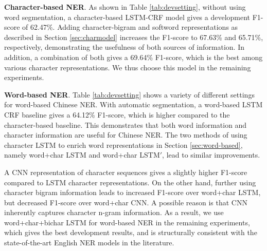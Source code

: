 \documentclass[11pt,a4paper]{article}
\begin{document}
\begin{CJK*}{UTF8}{gbsn}
\textbf{Character-based NER}. As shown in Table \ref{tab:devsetting}, without using word segmentation, a character-based LSTM-CRF model gives a development F1-score of 62.47\%. Adding character-bigram and softword representations as described in Section \ref{sec:charmodel} increases the F1-score to 67.63\% and 65.71\%, respectively, demonstrating the usefulness of both sources of information. In addition, a combination of both gives a 69.64\% F1-score, which is the best among various character representations. We thus choose this model in the remaining experiments. 


\textbf{Word-based NER}. Table \ref{tab:devsetting} shows a variety of different settings for word-based Chinese NER. With automatic segmentation, a word-based LSTM CRF baseline gives a 64.12\% F1-score, which is higher compared to the character-based baseline. This demonstrates that both word information and character information are useful for Chinese NER. The two methods of using character LSTM to enrich word representations in Section \ref{sec:word-based}, namely word+char LSTM and word+char LSTM$'$, lead to similar improvements.

A CNN representation of character sequences gives a slightly higher F1-score compared to LSTM character representations. On the other hand, further using character bigram information leads to increased F1-score over word+char LSTM, but decreased F1-score over word+char CNN. A possible reason is that CNN inherently captures character n-gram information. As a result, we use word+char+bichar LSTM for word-based NER in the remaining experiments, which gives the best development results, and is structurally consistent with the state-of-the-art English NER models in the literature. 




\end{CJK*}
\end{document}
